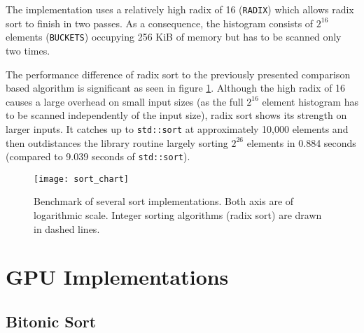 The implementation uses a relatively high radix of 16 (\lstinline!RADIX!) which allows radix sort to finish in two passes. As a consequence, the histogram consists of $2^{16}$ elements (\lstinline!BUCKETS!) occupying 256 KiB of memory but has to be scanned only two times.

The performance difference of radix sort to the previously presented comparison based algorithm is significant as seen in figure \ref{fig:sort_chart}. Although the high radix of 16 causes a large overhead on small input sizes (as the full $2^{16}$ element histogram has to be scanned independently of the input size), radix sort shows its strength on larger inputs. It catches up to \lstinline!std::sort! at approximately 10,000 elements and then outdistances the library routine largely sorting $2^{26}$ elements in 0.884 seconds (compared to 9.039 seconds of \lstinline!std::sort!).

\begin{figure}[h]
\centering
\texttt{[image: sort\_chart]}
\caption{Benchmark of several sort implementations.
Both axis are of logarithmic scale. Integer sorting algorithms (radix sort) are drawn in dashed lines.}
\label{fig:sort_chart}
\end{figure}

\section{GPU Implementations}

\subsection{Bitonic Sort}


